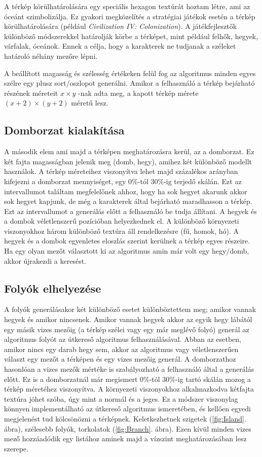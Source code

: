 A térkép körülhatárolására egy speciális hexagon textúrát hoztam létre, ami az óceánt szimbolizálja. Ez gyakori megközelítés a stratégiai játékok esetén a térkép körülhatárolására (például \textit{Civilization IV: Colonization}). A játékfejlesztők különböző módszerekkel határolják körbe a térképet, mint például felhők, hegyek, várfalak, óceánok. Ennek a célja, hogy a karakterek ne tudjanak a széleket határoló néhány mezőre lépni.

A beállított magasság és szélesség értékeken felül fog az algoritmus minden egyes szélre egy plusz sort/oszlopot generálni. Amikor a felhasználó a térkép bejárható részének méreteit $x \times y$ -nak adta meg, a kapott térkép mérete $(x+2) \times (y+2)$ méretű lesz.

\subsection{Domborzat kialakítása}

A második elem ami majd a térképen meghatározásra kerül, az a domborzat. Ez két fajta magasságban jelenik meg (domb, hegy), amihez két különböző modellt használok. A térkép méreteihez viszonyítva lehet majd százalékos arányban kifejezni a domborzat mennyiséget, egy $0\%$-tól $30\%$-ig terjedő skálán. Ezt az intervallumot találtam megfelelőnek ahhoz, hogy ha sok hegyet akarunk akkor sok hegyet kapjunk, de még a karakterek által bejárható maradhasson a térkép. Ezt az intervallumot a generálás előtt a felhasználó be tudja állítani. A hegyek és a dombok véletlenszerű pozícióban helyezkednek el. A különböző környezeti viszonyokhoz három különböző textúra áll rendelkezésre (fű, homok, hó). A hegyek és a dombok egyenletes eloszlás szerint kerülnek a térkép egyes részeire. Ha egy olyan mezőt választott ki az algoritmus amin már volt egy hegy/domb, akkor újrakezdi a keresést.

\subsection{Folyók elhelyezése}

A folyók generálásakor két különböző esetet különböztettem meg; amikor vannak hegyek és amikor nincsenek. Amikor vannak hegyek akkor az egyik hegy lábától egy másik vizes mezőig (a térkép szélei vagy egy már meglévő folyó) generál az algoritmus folyót az útkereső algoritmus felhasználásával. Abban az esetben, amikor nincs egy darab hegy sem, akkor az algoritmus vagy véletlenszerűen választ egy mezőt a térképen és egy vizes mezőig generál. A domborzathoz hasonlóan a vizes mezők mértéke is szabályozható a felhasználó által a generálás előtt. Ez is a domborzatnál már megismert $0\%$-tól $30\%$-ig tartó skálán mozog a térkép méretéhez viszonyítva. A környezeti viszonyokhoz alkalmazkodva kétfajta textúra jöhet szóba, úgy mint a normál és a jeges. Ez a módszer viszonylag könnyen implementálható az útkereső algoritmus ismeretében, és kellően egyedi megjelenést tud kölcsönözni a térképnek. Keletkezhetnek szigetek (\ref{fig:Island}. ábra), szélesebb folyók, torkolatok (\ref{fig:Branch}. ábra). Ezen kívül minden vizes mező hozzáadódik egy listához aminek majd a vízszint meghatározásában lesz szerepe.

